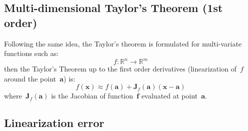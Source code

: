 \subsection{Multi-dimensional Taylor's Theorem (1st order)}
Following the same idea, the Taylor's theorem is formulated for multi-variate functions such as:
\begin{equation}
 f:\mathbb{R}^n \rightarrow \mathbb{R}^m
\end{equation}
then the Taylor's Theorem up to the first order derivatives (linearization of~$f$ around the point~$\mathbf{a}$) is:
\begin{equation}
f(\mathbf{x}) \approx f(\mathbf{a}) + \mathbf{J}_f(\mathbf{a})(\mathbf{x}-\mathbf{a})
\end{equation}
where~$\mathbf{J}_f(\mathbf{a})$ is the Jacobian of function~$\mathbf{f}$ evaluated at point~$\mathbf{a}$.



\subsection{Linearization error}


